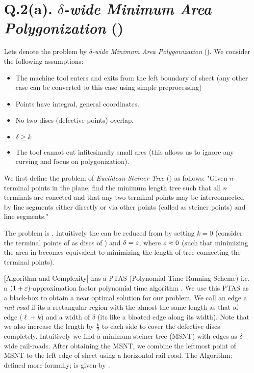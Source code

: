 \section*{Q.2(a). \emph{$\delta$-wide Minimum Area Polygonization} (\dmap)}
Lets denote the problem by \emph{$\delta$-wide Minimum Area Polygonization} (\dmap). We consider the following assumptions:
\begin{multicols}{2}
	\begin{itemize}
		\item The machine tool enters and exits from the left boundary of sheet (any other case can be converted to this case using simple preprocessing)
		\item Points have integral, general coordinates.
		\item No two discs (defective points) overlap.
		\item $\delta \geq k$
		\item The tool cannot cut infitesimally small arcs (this allows us to ignore any curving and focus on polygonization).
	\end{itemize}
\end{multicols}
We first define the problem of \emph{Euclidean Steiner Tree} (\est) as follows: 
"Given $n$ terminal points in the plane, find the minimum length tree such that all $n$ terminals are conected and that any two terminal points may be interconnected by line segments either directly or via other points (called as steiner points) and line segments."

The problem \est is \NPH. Intuitively the \dmap can be reduced from \est by setting $k=0$ (consider the terminal points of \est as discs of \dmap) and $\delta = \varepsilon$, where $\varepsilon \approx 0$  (such that minimizing the area in \dmap becomes equivalent to minimizing the length of tree connecting the terminal points).


[Algorithm and Complexity]
\est has a PTAS (Polynomial Time Running Scheme) i.e. a $(1+\varepsilon)$-approximation factor polynomial time algorithm \cite{byrka2010improved}. We use this PTAS as a black-box to obtain a near optimal solution for our problem. We call an edge a \emph{rail-road} if its a rectangular region with the almost the same length as that of edge ($\ell + k$) and a width of $\delta$ (its like a bloated edge along its width). Note that we also increase the length by $\frac{k}{2}$ to each side to cover the defective discs completely.
Intuitively we find a minimum steiner tree (MSNT) with edges as $\delta$-wide rail-roads. After obtaining the MSNT, we combine the leftmost point of MSNT to the left edge of sheet using a horizontal rail-road. The Algorithm; defined more formally; is given by .

